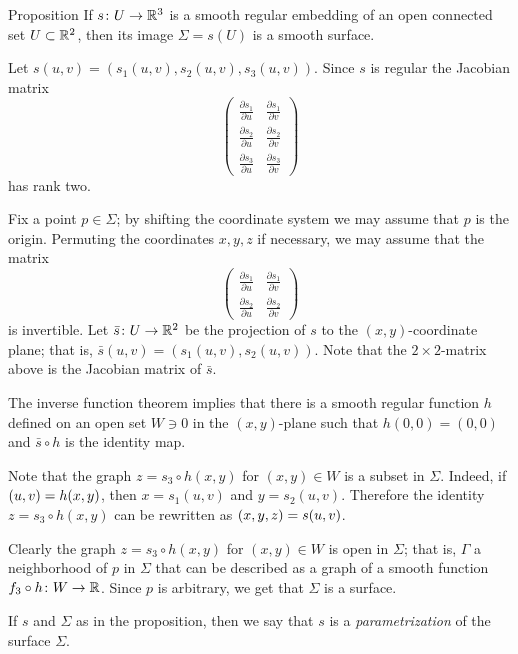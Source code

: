 \begin{thm}{Proposition}\label{prop:graph-chart}
If $s\colon U\to \mathbb{R}^3$ is a smooth regular embedding of an open connected set $U\subset \mathbb{R}^2$, then its image $\Sigma=s(U)$ is a smooth surface.
\end{thm}

Let $s(u,v)=(s_1(u,v),s_2(u,v),s_3(u,v))$.
Since $s$ is regular the Jacobian matrix
\[
\renewcommand\arraystretch{1.3}
\begin{pmatrix}
\tfrac{\partial s_1}{\partial u}&\tfrac{\partial s_1}{\partial v}\\
\tfrac{\partial s_2}{\partial u}&\tfrac{\partial s_2}{\partial v}\\
\tfrac{\partial s_3}{\partial u}&\tfrac{\partial s_3}{\partial v}
\end{pmatrix}
\]
has rank two.

Fix a point $p\in \Sigma$; by shifting the coordinate system we may assume that $p$ is the origin.
Permuting the coordinates $x,y,z$ if necessary, we may assume that 
the matrix 
\[
\renewcommand\arraystretch{1.3}
\begin{pmatrix}
\tfrac{\partial s_1}{\partial u}&\tfrac{\partial s_1}{\partial v}\\
\tfrac{\partial s_2}{\partial u}&\tfrac{\partial s_2}{\partial v}
\end{pmatrix}
\]
is invertible.
Let $\bar s\colon U\to\mathbb{R}^2$ be the projection of $s$ to the $(x,y)$-coordinate plane;
that is, $\bar s(u,v)=(s_1(u,v),s_2(u,v))$.
Note that the $2\times2$-matrix above is the Jacobian matrix of $\bar s$.

The inverse function theorem implies that there is a smooth regular function $h$ defined on an open set $W\ni 0$ in the $(x,y)$-plane
such that $h(0,0)=(0,0)$ and $\bar s\circ h$ is the identity map.

Note that the graph $z=s_3\circ h(x,y)$ for $(x,y)\in W$ is a subset in $\Sigma$.
Indeed, if $(u,v)\z=h(x,y)$, then $x=s_1(u,v)$ and $y=s_2(u,v)$.
Therefore the identity $z=s_3\circ h(x,y)$ can be rewritten as $(x,y,z)\z=s(u,v)$.

Clearly the graph $z=s_3\circ h(x,y)$ for $(x,y)\in W$ is open in $\Sigma$; %
that is, $\Gamma$ a neighborhood of $p$ in $\Sigma$ that can be described as a graph of a smooth function $f_3\circ h\colon W\to\mathbb{R}$.
Since $p$ is arbitrary, we get that $\Sigma$ is a surface.
\qeds

If $s$ and $\Sigma$ as in the proposition, then we say that $s$ is a \emph{parametrization} of the surface $\Sigma$. 

